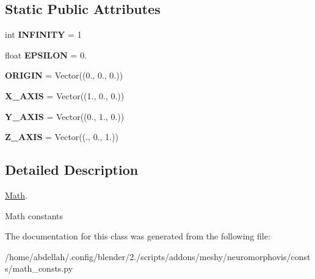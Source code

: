 \subsection*{Static Public Attributes}
\begin{DoxyCompactItemize}
\item 
int {\bfseries I\+N\+F\+I\+N\+I\+TY} = 1\hypertarget{classmeshy_1_1neuromorphovis_1_1consts_1_1math__consts_1_1Math_abcce3491798098c963f212ab68b999e2}{}\label{classmeshy_1_1neuromorphovis_1_1consts_1_1math__consts_1_1Math_abcce3491798098c963f212ab68b999e2}

\item 
float {\bfseries E\+P\+S\+I\+L\+ON} = 0.\hypertarget{classmeshy_1_1neuromorphovis_1_1consts_1_1math__consts_1_1Math_a92c707183fd80168481bc5921fdf358a}{}\label{classmeshy_1_1neuromorphovis_1_1consts_1_1math__consts_1_1Math_a92c707183fd80168481bc5921fdf358a}

\item 
{\bfseries O\+R\+I\+G\+IN} = Vector((0., 0., 0.))\hypertarget{classmeshy_1_1neuromorphovis_1_1consts_1_1math__consts_1_1Math_a2b17a804876ec73379437d519731f7be}{}\label{classmeshy_1_1neuromorphovis_1_1consts_1_1math__consts_1_1Math_a2b17a804876ec73379437d519731f7be}

\item 
{\bfseries X\+\_\+\+A\+X\+IS} = Vector((1., 0., 0.))\hypertarget{classmeshy_1_1neuromorphovis_1_1consts_1_1math__consts_1_1Math_a59c4eb2710312c54fef13f7c834faa69}{}\label{classmeshy_1_1neuromorphovis_1_1consts_1_1math__consts_1_1Math_a59c4eb2710312c54fef13f7c834faa69}

\item 
{\bfseries Y\+\_\+\+A\+X\+IS} = Vector((0., 1., 0.))\hypertarget{classmeshy_1_1neuromorphovis_1_1consts_1_1math__consts_1_1Math_aef41428a37b58ee368463cb61b30d5b2}{}\label{classmeshy_1_1neuromorphovis_1_1consts_1_1math__consts_1_1Math_aef41428a37b58ee368463cb61b30d5b2}

\item 
{\bfseries Z\+\_\+\+A\+X\+IS} = Vector((., 0., 1.))\hypertarget{classmeshy_1_1neuromorphovis_1_1consts_1_1math__consts_1_1Math_a00635e9c0e77b1ca6cf6b79f650e2741}{}\label{classmeshy_1_1neuromorphovis_1_1consts_1_1math__consts_1_1Math_a00635e9c0e77b1ca6cf6b79f650e2741}

\end{DoxyCompactItemize}


\subsection{Detailed Description}
\hyperlink{classmeshy_1_1neuromorphovis_1_1consts_1_1math__consts_1_1Math}{Math}. 

\begin{DoxyVerb}Math constants
\end{DoxyVerb}
 

The documentation for this class was generated from the following file\+:\begin{DoxyCompactItemize}
\item 
/home/abdellah/.\+config/blender/2./scripts/addons/meshy/neuromorphovis/consts/math\+\_\+consts.\+py\end{DoxyCompactItemize}
